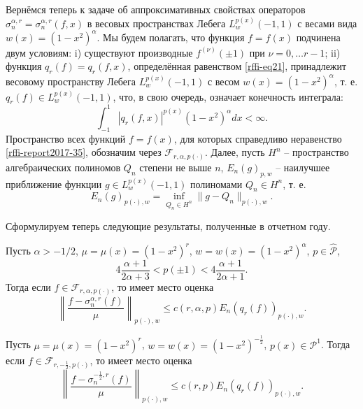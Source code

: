 Вернёмся теперь к задаче об аппроксимативных свойствах операторов
$\sigma_{n}^{\alpha,r}=\sigma_{n}^{\alpha,r}(f,x)$ в весовых пространствах Лебега $L^{p(x)}_w(-1,1)$ с весами вида $w(x)=(1-x^2)^\alpha$. Мы будем полагать, что функция $f=f(x)$ подчинена двум условиям: i)  существуют производные $f^{(\nu)}(\pm1)$ при $\nu=0,\ldots r-1$; ii) функция $q_r(f)=q_r(f,x)$, определённая равенством \eqref{rffi-eq21}, принадлежит весовому пространству Лебега $L^{p(x)}_w(-1,1)$ с весом $w(x)=(1-x^2)^\alpha$, т. е. $q_r(f)\in L^{p(x)}_w(-1,1)$, что, в свою очередь, означает конечность интеграла:
\begin{equation}\label{rffi-report2017-35}
\int_{-1}^1|q_r(f,x)|^{p(x)}(1-x^2)^\alpha dx<\infty.
\end{equation}
Пространство всех функций $f=f(x)$, для которых справедливо неравенство \eqref{rffi-report2017-35}, обозначим через $\mathcal{F}_{r,\alpha,p(\cdot)}$. Далее, пусть  $H^n$ -- пространство алгебраических полиномов $Q_n$ степени не выше $n$,  $E_n(g)_{p,w}$ -- наилучшее приближение функции $g\in  L^{p(x)}_w(-1,1)$ полиномами $Q_n\in H^n$, т. е.
\begin{equation}\label{rffi-report2017-36}
E_n(g)_{p(\cdot),w}=\inf_{Q_n\in H^n}\|g-Q_n\|_{p(\cdot),w}.
\end{equation}

Сформулируем теперь следующие результаты, полученные в отчетном году.

\begin{theorem}\label{rffi-report2017-weighted-spec-est-jacobi}
Пусть $\alpha>-1/2$, $\mu=\mu(x)=(1-x^2)^r$, $w=w(x)=(1-x^2)^\alpha$, $p\in\mathcal{ \hat P}$,
$$4\frac{\alpha+1}{2\alpha+3}<p(\pm1)<4\frac{\alpha+1}{2\alpha+1}.$$
Тогда если $f\in \mathcal{ F}_{r,\alpha,p(\cdot)}$, то имеет место оценка
\begin{equation*}%
\left\|\frac{f-\sigma_{n}^{\alpha,r}(f)}{\mu}\right\|_{p(\cdot),w}\le c(r,\alpha,p)E_n(q_r(f))_{p(\cdot),w}.
\end{equation*}
\end{theorem}

\begin{theorem}\label{rffi-report2017-weighted-spec-est-tcheb}
Пусть $\mu=\mu(x)=(1-x^2)^r$, $w=w(x)=(1-x^2)^{-\frac12}$, $p(x) \in \mathcal{ P}^1$. Тогда если $f\in \mathcal{ F}_{r,-\frac12,p(\cdot)}$, то имеет место оценка
\begin{equation*}%
\left\|\frac{f-\sigma_{n}^{-\frac12,r}(f)}{\mu}\right\|_{p(\cdot),w}\le c(r,p)E_n(q_r(f))_{p(\cdot),w}.
\end{equation*}
\end{theorem} 